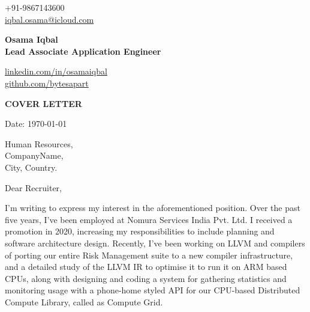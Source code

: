 \documentclass[11pt,a4paper]{article}
\begin{document}

\begin{center}
    \begin{minipage}[b]{0.24\textwidth}
            \large +91-9867143600 \\
            \large \href{mailto:iqbal.osama@icloud.com}{iqbal.osama@icloud.com} 
    \end{minipage}%
    \begin{minipage}[b]{0.5\textwidth}
            \centering
            {\Huge \textbf{Osama Iqbal}} \\ 
            \vspace{0.1cm}
            {\color{CarianBlue}\Large{\textbf{Lead Associate Application Engineer}}}
    \end{minipage}%
    \begin{minipage}[b]{0.28\textwidth}
            \flushright \large
            {\href{https://www.linkedin.com/in/osamaiqbal/}{linkedin.com/in/osamaiqbal} } \\
            \href{https://github.com/bytesapart}{github.com/bytesapart}
    \end{minipage}   
    
\vspace{-0.15cm} 
{\color{CarianBlue} \hrulefill}
\end{center}

\justify
\setlength{\parindent}{0pt}
\setlength{\parskip}{12pt}
\vspace{0.2cm}
\begin{center}
  {\color{CarianBlue} \Large{\textbf{COVER LETTER}}}
\end{center}


Date: \today \par \vspace{-0.1cm}

Human Resources, \\
CompanyName, \\
City, Country.


Dear Recruiter,  %

I'm writing to express my interest in the aforementioned position. Over the past five years, I've been employed at Nomura Services India Pvt. Ltd. I received a promotion in 2020, increasing my responsibilities to include planning and software architecture design. Recently, I've been working on LLVM and compilers of porting our entire Risk Management suite to a new compiler infrastructure, and a detailed study of the LLVM IR to optimise it to run it on ARM based CPUs, along with designing and coding a system for gathering statistics and monitoring usage with a phone-home styled API for our CPU-based Distributed Compute Library, called as Compute Grid. \par
 
\end{document}
